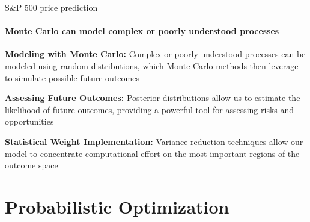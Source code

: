 \documentclass{beamer}
\begin{document}
\begin{frame}{S\&P 500 price prediction}
  \framesubtitle{Monte Carlo can model complex or poorly understood processes}

  \textbf{Modeling with Monte Carlo:} Complex or poorly understood processes
  can be modeled using random distributions, which Monte Carlo methods then
  leverage to simulate possible future outcomes

  \vspace{0.5cm}

  \textbf{Assessing Future Outcomes:} Posterior distributions allow us to
  estimate the likelihood of future outcomes, providing a powerful tool
  for assessing risks and opportunities

  \vspace{0.5cm}

  \textbf{Statistical Weight Implementation:} Variance reduction techniques
  allow our model to concentrate computational effort on the most important
  regions of the outcome space

  \vspace{0.5cm}
\end{frame}

\section{Probabilistic Optimization}
\end{document}
